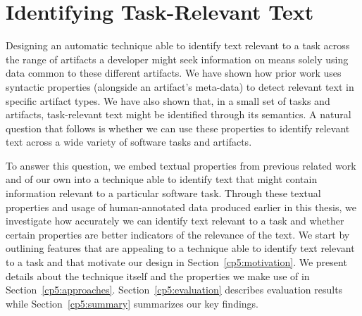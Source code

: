 \setcounter{chapter}{4}
\setcounter{rq}{1}


\chapter{Identifying Task-Relevant Text}
\label{ch:identifying}



Designing an automatic technique able to identify text relevant to a task across the range of artifacts a developer might seek information on means solely using data common to these different artifacts.
We have shown how  prior work uses syntactic properties (alongside an artifact's meta-data)
to detect relevant text in specific artifact types.
We have also shown that, in a small set of tasks and artifacts, task-relevant text might be identified through its semantics.
A natural question that follows is whether we can use these properties to identify relevant text across a wide variety of software tasks and artifacts.




To answer this question, we embed textual properties from previous related work and of our own 
into a technique able to identify text that might contain information relevant to a particular software task.
Through these textual properties and usage of human-annotated data produced earlier in this thesis, we 
investigate how accurately we can identify text relevant to a task and whether certain properties are better indicators of the relevance of the text.
We start by outlining features that are appealing to a technique able to identify text relevant to a task and that motivate our design in Section~\ref{cp5:motivation}.
We present details about the technique itself and the properties we make use of in Section~\ref{cp5:approaches}.
Section~\ref{cp5:evaluation} describes evaluation results while
Section~\ref{cp5:summary} summarizes our key findings.









